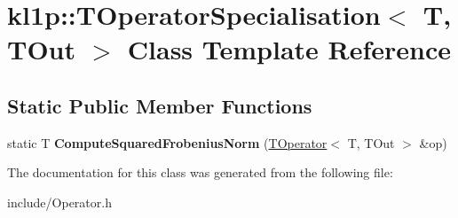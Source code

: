 \hypertarget{classkl1p_1_1TOperatorSpecialisation}{}\section{kl1p\+:\+:T\+Operator\+Specialisation$<$ T, T\+Out $>$ Class Template Reference}
\label{classkl1p_1_1TOperatorSpecialisation}
\subsection*{Static Public Member Functions}
\begin{DoxyCompactItemize}
\item 
static T {\bfseries Compute\+Squared\+Frobenius\+Norm} (\hyperlink{classkl1p_1_1TOperator}{T\+Operator}$<$ T, T\+Out $>$ \&op)\hypertarget{classkl1p_1_1TOperatorSpecialisation_a93091014ed82dca84890867445cc7eb0}{}\label{classkl1p_1_1TOperatorSpecialisation_a93091014ed82dca84890867445cc7eb0}

\end{DoxyCompactItemize}


The documentation for this class was generated from the following file\+:\begin{DoxyCompactItemize}
\item 
include/Operator.\+h\end{DoxyCompactItemize}
